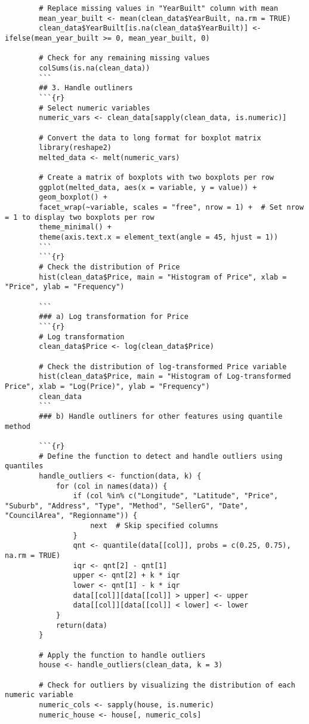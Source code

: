 \documentclass[12pt,doublespace]{article}
\begin{document}
\begin{lstlisting}
		# Replace missing values in "YearBuilt" column with mean
		mean_year_built <- mean(clean_data$YearBuilt, na.rm = TRUE)
		clean_data$YearBuilt[is.na(clean_data$YearBuilt)] <- ifelse(mean_year_built >= 0, mean_year_built, 0)
		
		# Check for any remaining missing values
		colSums(is.na(clean_data))
		```
		## 3. Handle outliners
		```{r}
		# Select numeric variables
		numeric_vars <- clean_data[sapply(clean_data, is.numeric)]
		
		# Convert the data to long format for boxplot matrix
		library(reshape2)
		melted_data <- melt(numeric_vars)
		
		# Create a matrix of boxplots with two boxplots per row
		ggplot(melted_data, aes(x = variable, y = value)) +
		geom_boxplot() +
		facet_wrap(~variable, scales = "free", nrow = 1) +  # Set nrow = 1 to display two boxplots per row
		theme_minimal() +
		theme(axis.text.x = element_text(angle = 45, hjust = 1))
		```
		```{r}
		# Check the distribution of Price 
		hist(clean_data$Price, main = "Histogram of Price", xlab = "Price", ylab = "Frequency")
		
		```
		### a) Log transformation for Price
		```{r}
		# Log transformation
		clean_data$Price <- log(clean_data$Price)
		
		# Check the distribution of log-transformed Price variable
		hist(clean_data$Price, main = "Histogram of Log-transformed Price", xlab = "Log(Price)", ylab = "Frequency")
		clean_data
		```
		### b) Handle outliners for other features using quantile method
		
		```{r}
		# Define the function to detect and handle outliers using quantiles
		handle_outliers <- function(data, k) {
			for (col in names(data)) {
				if (col %in% c("Longitude", "Latitude", "Price", "Suburb", "Address", "Type", "Method", "SellerG", "Date", "CouncilArea", "Regionname")) {
					next  # Skip specified columns
				}
				qnt <- quantile(data[[col]], probs = c(0.25, 0.75), na.rm = TRUE)
				iqr <- qnt[2] - qnt[1]
				upper <- qnt[2] + k * iqr
				lower <- qnt[1] - k * iqr
				data[[col]][data[[col]] > upper] <- upper
				data[[col]][data[[col]] < lower] <- lower
			}
			return(data)
		}
		
		# Apply the function to handle outliers
		house <- handle_outliers(clean_data, k = 3)
		
		# Check for outliers by visualizing the distribution of each numeric variable
		numeric_cols <- sapply(house, is.numeric)
		numeric_house <- house[, numeric_cols]
		

\end{lstlisting}
\end{document}
